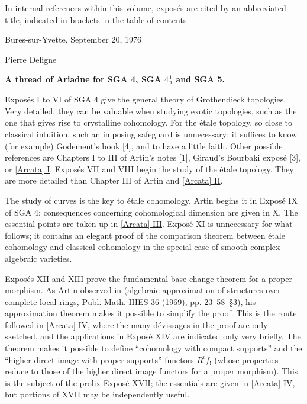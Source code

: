 In internal references within this volume, expos\'es are cited by an
abbreviated title, indicated in brackets in the table of contents.

\vspace{20pt}
Bures-sur-Yvette, September 20, 1976

\vspace{5pt}
Pierre Deligne


\markboth{}{}
\thispagestyle{plain}
{}
\begin{center}
\textbf{A thread of Ariadne for SGA 4, SGA $4\frac12$ and SGA 5.}
\end{center}
\label{Ariane}

Exposés I to VI of SGA 4 give the general theory of Grothendieck topologies.
Very detailed, they can be valuable when studying exotic topologies, such as
the one that gives rise to crystalline cohomology. For the étale topology,
so close to classical intuition, such an imposing safeguard is unnecessary:
it suffices to know (for example) Godement's book [4], and to have a little
faith. Other possible references are Chapters I to III of Artin's notes [1],
Giraud's Bourbaki exposé [3], or \hyperref[I:1]{[Arcata] I}. Exposés VII and
VIII begin the study of the étale topology. They are more detailed than
Chapter III of Artin and \hyperref[I:2]{[Arcata] II}.

The study of curves is the key to étale cohomology. Artin begins it in
Exposé IX of SGA 4; consequences concerning cohomological dimension are
given in X. The essential points are taken up in \hyperref[I:3]{[Arcata] III}.
Exposé XI is unnecessary for what follows; it contains an elegant proof of
the comparison theorem between étale cohomology and classical cohomology
in the special case of smooth complex algebraic varieties.

Exposés XII and XIII prove the fundamental base change theorem for a proper
morphism. As Artin observed in (algebraic approximation of structures over
complete local rings, Publ. Math. IHES 36 (1969), pp. 23--58--§3), his
approximation theorem makes it possible to simplify the proof. This is the
route followed in \hyperref[I:4]{[Arcata] IV}, where the many dévissages in
the proof are only sketched, and the applications in Exposé XIV are indicated
only very briefly. The theorem makes it possible to define ``cohomology with
compact supports'' and the ``higher direct image with proper supports''
functors $R^i f_!$ (whose properties reduce to those of the higher direct image
functors for a proper morphism). This is the subject of the prolix Exposé XVII;
the essentials are given in \hyperref[I:4]{[Arcata] IV}, but portions of XVII
may be independently useful.

